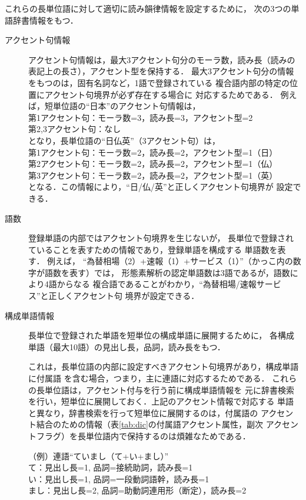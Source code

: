 これらの長単位語に対して適切に読み韻律情報を設定するために，
次の3つの単語辞書情報をもつ．

\begin{description}
\item[アクセント句情報]
アクセント句情報は，最大3アクセント句分のモーラ数，読み長（読みの
表記上の長さ），アクセント型を保持する．
最大3アクセント句分の情報をもつのは，固有名詞など，1語で登録されている
複合語内部の特定の位置にアクセント句境界が必ず存在する場合に
対応するためである．
例えば，短単位語の``日本''のアクセント句情報は，\\
\hspace*{1cm}第1アクセント句：モーラ数=3，読み長=3，アクセント型=2\\
\hspace*{1cm}第2,3アクセント句：なし\\
となり，長単位語の``日仏英''（3アクセント句）は，\\
\hspace*{1cm}第1アクセント句：モーラ数=2，読み長=2，アクセント型=1（日）\\
\hspace*{1cm}第2アクセント句：モーラ数=2，読み長=2，アクセント型=1（仏）\\
\hspace*{1cm}第3アクセント句：モーラ数=2，読み長=2，アクセント型=1（英）\\
となる．この情報により，``日/仏/英''と正しくアクセント句境界が
設定できる．
\item[語数]登録単語の内部ではアクセント句境界を生じないが，
長単位で登録されていることを表すための情報であり，登録単語を構成する
単語数を表す．
例えば，
``為替相場（2）+速\mbox{報（1）+サービス（1）''（かっこ内の数字が語数を表す）では，}
形態素解析の認定単語数は3語であるが，語数により4語からなる
複合語であることがわかり，``為替相場/速報サービス''と正しくアクセント句
境界が設定できる．
\item[構成単語情報]
長単位で登録された単語を短単位の構成単語に展開するために，
各構成単語（最大10語）の見出し長，品詞，読み長をもつ．

これは，長単位語の内部に設定すべきアクセント句境界があり，構成単語に付属語
を含む場合，つまり，主に連語に対応するためである．
これらの長単位語は，アクセント付与を行う前に構成単語情報を
元に辞書検索を行い，短単位に展開しておく．上記のアクセント情報で対応する
単語と異なり，辞書検索を行って短単位に展開するのは，付属語の
アクセント結合のための情報（表\ref{tab:dic}の付属語アクセント属性，副次
アクセントフラグ）を長単位語内で保持するのは煩雑なためである．

（例）連語``ていまし（て+い+まし）''\\
\hspace*{1cm}て：見出し長=1, 品詞=接続助詞，読み長=1\\
\hspace*{1cm}い：見出し長=1, 品詞=一段動詞語幹，読み長=1\\
\hspace*{1cm}まし：見出し長=2, 品詞=助動詞連用形（断定），読み長=2
\end{description}

